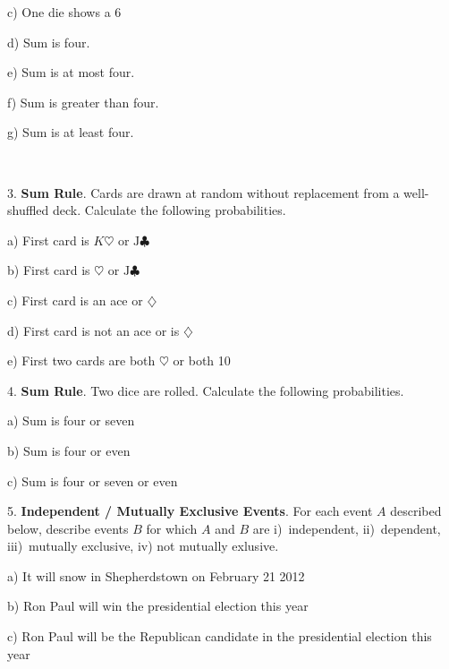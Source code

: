 \documentclass[10pt]{article}
\begin{document}
\hspace{20pt} c) One die shows a 6
\bigskip\bigskip

\hspace{20pt} d) Sum is four.
\bigskip\bigskip

\hspace{20pt} e) Sum is at most four.
\bigskip\bigskip

\hspace{20pt} f) Sum is greater than four.
\bigskip\bigskip

\hspace{20pt} g) Sum is at least four.

\vfill
\eject
{\ }


3. \textbf{Sum Rule}. Cards are drawn at random without replacement from a well-shuffled deck.
Calculate the following probabilities.
\medskip

\hspace{20pt} a) First card is $K\heartsuit$ or $\mbox{J}\clubsuit$
\bigskip\medskip

\hspace{20pt} b) First card is $\heartsuit$ or $\mbox{J}\clubsuit$
\bigskip\medskip

\hspace{20pt} c) First card is an ace or $\diamondsuit$
\bigskip\medskip

\hspace{20pt} d) First card is not an ace or is $\diamondsuit$
\bigskip\medskip

\hspace{20pt} e) First two cards are both $\heartsuit$ or both 10
\bigskip\medskip

4. \textbf{Sum Rule}. Two dice are rolled. Calculate the following probabilities.
\medskip

\hspace{20pt} a) Sum is four or seven
\bigskip

\hspace{20pt} b) Sum is four or even
\bigskip

\hspace{20pt} c) Sum is four or seven or even
\bigskip\bigskip

5. \textbf{Independent / Mutually Exclusive Events}. 
For each event $A$ described below, describe events $B$ for which
$A$ and $B$ are
i)~independent, ii)~dependent,
iii)~mutually exclusive, iv) not mutually exlusive.
\medskip

\hspace{20pt} a) It will snow in Shepherdstown on February 21 2012
\vspace{1in}


\hspace{20pt} b) Ron Paul will win the presidential election this year
\vspace{1in}


\hspace{20pt} c) Ron Paul will be the Republican candidate in the presidential
   election this year
\vspace{1in}


\vfill
\eject
\end{document}
